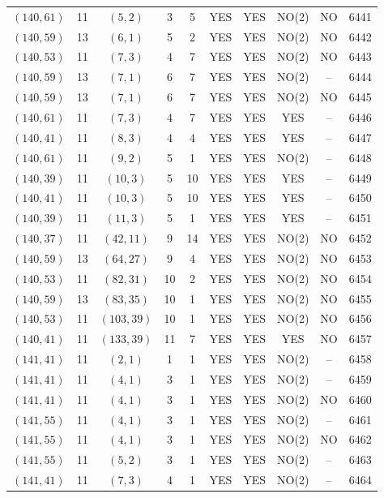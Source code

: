\begin{longtable}{|c|c|c|c|c|c|c|c|c|c|}
$(140, 61)$ & 11 & $(5, 2)$ & 3 & 5 & YES & YES & NO(2) & NO & 6441\\
$(140, 59)$ & 13 & $(6, 1)$ & 5 & 2 & YES & YES & NO(2) & NO & 6442\\
$(140, 53)$ & 11 & $(7, 3)$ & 4 & 7 & YES & YES & NO(2) & NO & 6443\\
$(140, 59)$ & 13 & $(7, 1)$ & 6 & 7 & YES & YES & NO(2) & -- & 6444\\
$(140, 59)$ & 13 & $(7, 1)$ & 6 & 7 & YES & YES & NO(2) & NO & 6445\\
$(140, 61)$ & 11 & $(7, 3)$ & 4 & 7 & YES & YES & YES & -- & 6446\\
$(140, 41)$ & 11 & $(8, 3)$ & 4 & 4 & YES & YES & YES & -- & 6447\\
$(140, 61)$ & 11 & $(9, 2)$ & 5 & 1 & YES & YES & NO(2) & -- & 6448\\
$(140, 39)$ & 11 & $(10, 3)$ & 5 & 10 & YES & YES & YES & -- & 6449\\
$(140, 41)$ & 11 & $(10, 3)$ & 5 & 10 & YES & YES & YES & -- & 6450\\
$(140, 39)$ & 11 & $(11, 3)$ & 5 & 1 & YES & YES & YES & -- & 6451\\
$(140, 37)$ & 11 & $(42, 11)$ & 9 & 14 & YES & YES & NO(2) & NO & 6452\\
$(140, 59)$ & 13 & $(64, 27)$ & 9 & 4 & YES & YES & NO(2) & NO & 6453\\
$(140, 53)$ & 11 & $(82, 31)$ & 10 & 2 & YES & YES & NO(2) & NO & 6454\\
$(140, 59)$ & 13 & $(83, 35)$ & 10 & 1 & YES & YES & NO(2) & NO & 6455\\
$(140, 53)$ & 11 & $(103, 39)$ & 10 & 1 & YES & YES & NO(2) & NO & 6456\\
$(140, 41)$ & 11 & $(133, 39)$ & 11 & 7 & YES & YES & YES & NO & 6457\\
$(141, 41)$ & 11 & $(2, 1)$ & 1 & 1 & YES & YES & NO(2) & -- & 6458\\
$(141, 41)$ & 11 & $(4, 1)$ & 3 & 1 & YES & YES & NO(2) & -- & 6459\\
$(141, 41)$ & 11 & $(4, 1)$ & 3 & 1 & YES & YES & NO(2) & NO & 6460\\
$(141, 55)$ & 11 & $(4, 1)$ & 3 & 1 & YES & YES & NO(2) & -- & 6461\\
$(141, 55)$ & 11 & $(4, 1)$ & 3 & 1 & YES & YES & NO(2) & NO & 6462\\
$(141, 55)$ & 11 & $(5, 2)$ & 3 & 1 & YES & YES & NO(2) & -- & 6463\\
$(141, 41)$ & 11 & $(7, 3)$ & 4 & 1 & YES & YES & NO(2) & -- & 6464\\

\end{longtable}
